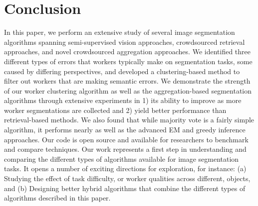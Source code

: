 \section{Conclusion}
In this paper, we perform an extensive study of several image segmentation algorithms spanning semi-supervised vision approaches, crowdsourced retrieval approaches, and novel crowdsourced aggregation approaches. We identified three different types of errors that workers typically make on segmentation tasks, some caused by differing perspectives, and developed a clustering-based method to filter out workers that are making semantic errors. We demonstrate the strength of our worker clustering algorithm as well as the aggregation-based segmentation algorithms through extensive experiments in 1) its ability to improve as more worker segmentations are collected and 2) yield better performance than retrieval-based methods. We also found that while majority vote is a fairly simple algorithm, it performs nearly as well as the advanced EM and greedy inference approaches. Our code is open source and available for researchers to benchmark and compare techniques. Our work represents a first step in understanding and comparing the different types of algorithms available for image segmentation tasks. It opens a number of exciting directions for exploration, for instance: (a) Studying the effect of task difficulty, or worker qualities across different, objects, and (b) Designing better hybrid algorithms that combine the different types of algorithms described in this paper.
